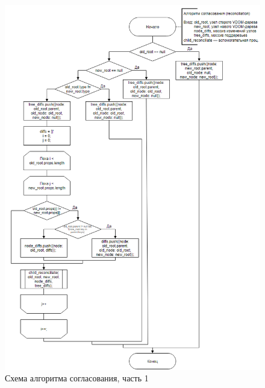 \begin{figure}[h]
	\centering
	\includegraphics[width=170mm]{img/reconciliation-algorithm.png}
	\caption{Схема алгоритма согласования, часть 1}
	\label{fig:reconciliation-algorithm}
\end{figure}

